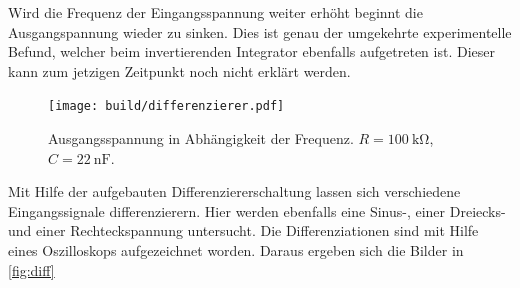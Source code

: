 Wird die Frequenz der Eingangsspannung weiter erhöht beginnt die Ausgangspannung
wieder zu sinken.
Dies ist genau der umgekehrte experimentelle Befund, welcher beim invertierenden Integrator
ebenfalls aufgetreten ist.
Dieser kann zum jetzigen Zeitpunkt noch nicht erklärt werden.
\begin{figure}
    \centering
    \texttt{[image: build/differenzierer.pdf]}
    \caption{Ausgangsspannung in Abhängigkeit der Frequenz. $R = \SI{100}{\kilo\ohm}$,
        $C = \SI{22}{\nano\farad}$.}
    \label{fig:differenzierer}
\end{figure}
\FloatBarrier
Mit Hilfe der aufgebauten Differenziererschaltung lassen sich verschiedene Eingangssignale 
differenzierern. 
Hier werden ebenfalls eine Sinus-, einer Dreiecks- und einer Rechteckspannung 
untersucht.
Die Differenziationen sind mit Hilfe eines Oszilloskops aufgezeichnet worden.
Daraus ergeben sich die Bilder in \autoref{fig:diff}
